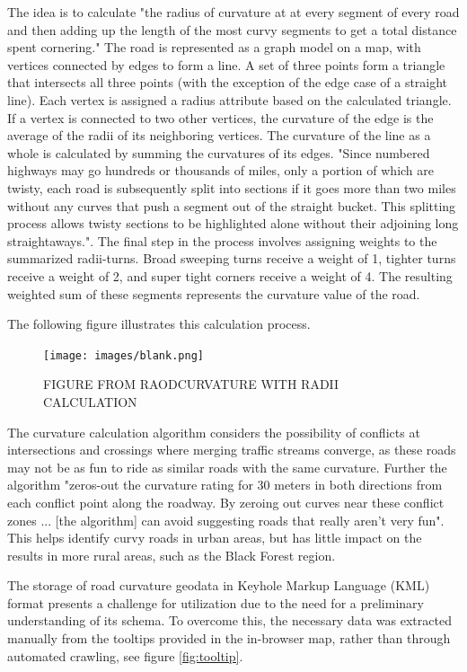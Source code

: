 The idea is to calculate "the radius of curvature at at every segment of every road and then adding up the length of the most curvy segments to get a total distance spent cornering.\cite{roadcurvature.com}" The road is represented as a graph model on a map, with vertices connected by edges to form a line. A set of three points form a triangle that intersects all three points (with the exception of the edge case of a straight line). Each vertex is assigned a radius attribute based on the calculated triangle. If a vertex is connected to two other vertices, the curvature of the edge is the average of the radii of its neighboring vertices. The curvature of the line as a whole is calculated by summing the curvatures of its edges. "Since numbered highways may go hundreds or thousands of miles, only a portion of which are twisty, each road is subsequently split into sections if it goes more than two miles without any curves that push a segment out of the straight bucket. This splitting process allows twisty sections to be highlighted alone without their adjoining long straightaways.\cite{roadcurvature.com}". The final step in the process involves assigning weights to the summarized radii-turns. Broad sweeping turns receive a weight of 1, tighter turns receive a weight of 2, and super tight corners receive a weight of 4. The resulting weighted sum of these segments represents the curvature value of the road.

The following figure illustrates this calculation process. 
\begin{figure}[h]
\centering
    \texttt{[image: images/blank.png]}
    \caption{FIGURE FROM RAODCURVATURE WITH RADII CALCULATION \cite{roadcurvature.com}}
    \label{fig:radiicalculation}
\end{figure}

The curvature calculation algorithm considers the possibility of conflicts at intersections and crossings where merging traffic streams converge, as these roads may not be as fun to ride as similar roads with the same curvature. Further the algorithm "zeros-out the curvature rating for 30 meters in both directions from each conflict point along the roadway. By zeroing out curves near these conflict zones ... [the algorithm] can avoid suggesting roads that really aren't very fun\cite{roadcurvature.com}". This helps identify curvy roads in urban areas, but has little impact on the results in more rural areas, such as the Black Forest region.

The storage of road curvature geodata in Keyhole Markup Language (KML) format presents a challenge for utilization due to the need for a preliminary understanding of its schema. To overcome this, the necessary data was extracted manually from the tooltips provided in the in-browser map, rather than through automated crawling, see figure \ref{fig:tooltip}.

